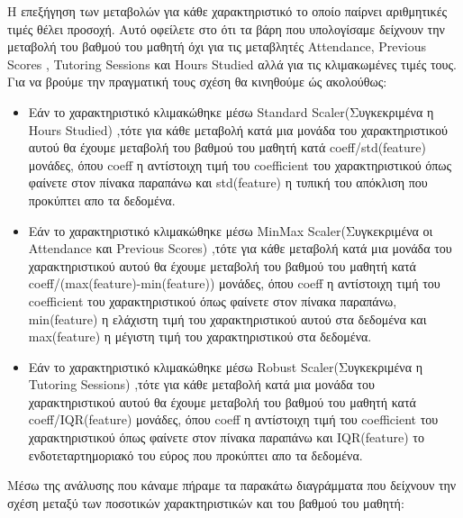 \documentclass[12pt]{article}
\begin{document}
\noindent Η επεξήγηση των μεταβολών για κάθε χαρακτηριστικό το οποίο παίρνει αριθμητικές τιμές θέλει
 προσοχή. Αυτό οφείλετε στο ότι τα βάρη που υπολογίσαμε δείχνουν την μεταβολή του βαθμού του
 μαθητή όχι για τις μεταβλητές Attendance, Previous Scores , Tutoring Sessions και Hours Studied
 αλλά για τις κλιμακωμένες τιμές τους. Για να βρούμε την πραγματική τους σχέση θα κινηθούμε
 ώς ακολούθως:\\
 
 \begin{itemize}
    \item Εάν το χαρακτηριστικό κλιμακώθηκε μέσω Standard Scaler(Συγκεκριμένα η Hours Studied) ,τότε για κάθε μεταβολή κατά μια μονάδα του χαρακτηριστικού αυτού θα έχουμε μεταβολή του βαθμού του μαθητή κατά coeff/std(feature) μονάδες, όπου coeff η αντίστοιχη τιμή του coefficient του χαρακτηριστικού όπως φαίνετε στον πίνακα παραπάνω και std(feature) η τυπική του απόκλιση που προκύπτει απο τα δεδομένα.
    
    \item Εάν το χαρακτηριστικό κλιμακώθηκε μέσω MinMax Scaler(Συγκεκριμένα οι Attendance και Previous Scores) ,τότε για κάθε μεταβολή κατά μια μονάδα του χαρακτηριστικού αυτού θα έχουμε μεταβολή του βαθμού του μαθητή κατά coeff/(max(feature)-min(feature)) μονάδες, όπου coeff η αντίστοιχη τιμή του coefficient του χαρακτηριστικού όπως φαίνετε στον πίνακα παραπάνω, min(feature) η ελάχιστη τιμή του χαρακτηριστικού αυτού στα δεδομένα και max(feature) η μέγιστη τιμή του χαρακτηριστικού στα δεδομένα.
    
     \item Εάν το χαρακτηριστικό κλιμακώθηκε μέσω Robust Scaler(Συγκεκριμένα η Tutoring Sessions) ,τότε για κάθε μεταβολή κατά μια μονάδα του χαρακτηριστικού αυτού θα έχουμε μεταβολή του βαθμού του μαθητή κατά coeff/IQR(feature) μονάδες, όπου coeff η αντίστοιχη τιμή του coefficient του χαρακτηριστικού όπως φαίνετε στον πίνακα παραπάνω και IQR(feature) το ενδοτεταρτημοριακό του εύρος που προκύπτει απο τα δεδομένα.
  \end{itemize}
  
\noindent Μέσω της ανάλυσης που κάναμε πήραμε τα παρακάτω διαγράμματα που δείχνουν την σχέση μεταξύ των ποσοτικών χαρακτηριστικών και του βαθμού του μαθητή: \\
\end{document}
